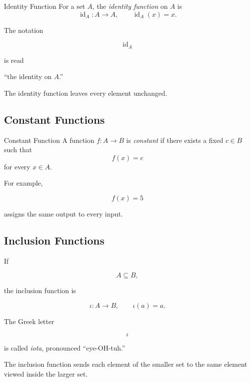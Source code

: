 \begin{definitionbox}{Identity Function}
For a set \(A\), the \emph{identity function} on \(A\) is
\[ \operatorname{id}_A:A\to A,\qquad \operatorname{id}_A(x)=x. \]
\end{definitionbox}

The notation

\[ \operatorname{id}_A \]

is read

\begin{center}
``the identity on \(A\).''
\end{center}

The identity function leaves every element unchanged.

\subsection{Constant Functions}
\label{subsec:constant-functions}

\begin{definitionbox}{Constant Function}
A function \(f:A\to B\) is \emph{constant} if there exists a fixed
\(c\in B\) such that
\[ f(x)=c \]
for every \(x\in A\).
\end{definitionbox}

For example,

\[ f(x)=5 \]

assigns the same output to every input.

\subsection{Inclusion Functions}
\label{subsec:inclusion-functions}

If

\[ A\subseteq B, \]

the inclusion function is

\[ \iota:A\to B,\qquad \iota(a)=a. \]

The Greek letter

\[ \iota \]

is called \emph{iota}, pronounced ``eye-OH-tuh.''

The inclusion function sends each element of the smaller set to the same
element viewed inside the larger set.

